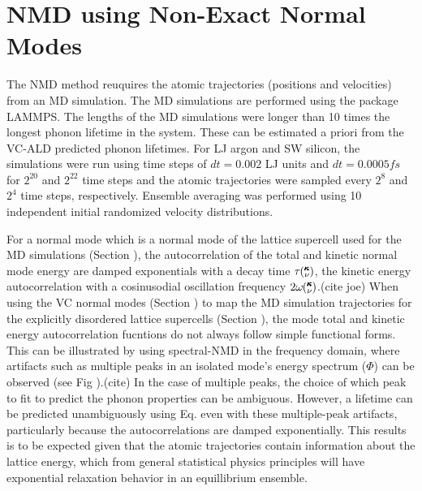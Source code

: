 \documentclass[aps,prb,onecolumn,preprint,superscriptaddress,amsmath,amssymb,floatfix]{revtex4}
\newcommand{\kv}{\mspace{-4.0mu}\left(\mspace{-8.0mu}
\begin{smallmatrix}&\pmb{\kappa} \\&\nu\end{smallmatrix}
\mspace{-3.0mu}\right)}
\begin{document}

\section{\label{A:NMD XCORR}
NMD using Non-Exact Normal Modes}

The NMD method reuquires the atomic trajectories (positions and velocities) 
from an MD simulation. 
The MD simulations are performed using the package LAMMPS.
\cite{plimpton_fast_1995} The lengths of the MD simulations were longer 
than 10 times the longest phonon lifetime in the system. These can 
be estimated a priori from the VC-ALD predicted phonon lifetimes. For LJ 
argon and SW silicon, the simulations were run using time steps of 
$dt=0.002$ LJ units and $dt = 0.0005 fs$ for $2^20$ and 
$2^22$ time steps and the atomic trajectories were sampled 
every $2^8$ and $2^4$ time steps, respectively. 
Ensemble averaging was performed using 10 independent initial 
randomized velocity distributions. 

For a normal mode which is a normal mode of the lattice supercell 
used for the MD simulations (Section ), 
the autocorrelation of the total and kinetic     
normal mode energy are damped exponentials 
with a decay time $\tau\kv$, the kinetic energy autocorrelation with a 
cosinusodial oscillation frequency 
$2\omega\kv$.(cite joe) 
When using the VC normal modes (Section ) to map the MD simulation 
trajectories for the explicitly disordered lattice supercells (Section ), 
the mode total and kinetic energy autocorrelation fucntions 
do not always follow simple functional forms. 
This can be illustrated by using spectral-NMD 
in the frequency domain, where artifacts such as 
multiple peaks in an isolated mode's 
energy spectrum ($\Phi$) can be observed (see Fig ).(cite)  
In the case 
of multiple peaks, the choice of which peak to fit to predict the phonon 
properties can be ambiguous.  However, 
a lifetime can be predicted unambiguously using Eq. even with 
these multiple-peak artifacts, particularly because the autocorrelations 
are damped exponentially. This results is to be expected 
given that the atomic trajectories contain 
information about the lattice energy, which from general statistical 
physics principles will have exponential relaxation behavior in an 
equillibrium ensemble.
\cite{srivastava_physics_1990,landau_statistical_1980,
rajabpour_thermal_2010}
\end{document}
